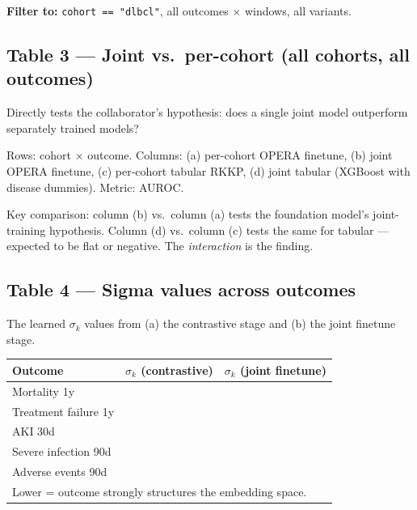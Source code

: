 \documentclass[11pt, a4paper]{article}
\newcommand{\code}[1]{\texttt{\small #1}}
\begin{document}
\medskip
\begin{tcolorbox}[notebox]
  \textbf{Filter to:} \code{cohort == "dlbcl"}, all outcomes × windows, all variants.
\end{tcolorbox}

\subsection{Table 3 — Joint vs.\ per-cohort (all cohorts, all outcomes)}

Directly tests the collaborator's hypothesis: does a single joint model
outperform separately trained models?

\medskip
Rows: cohort × outcome. Columns: (a) per-cohort OPERA finetune,
(b) joint OPERA finetune, (c) per-cohort tabular RKKP,
(d) joint tabular (XGBoost with disease dummies). Metric: AUROC.

\medskip
\begin{tcolorbox}[notebox]
  Key comparison: column (b) vs.\ column (a) tests the foundation
  model's joint-training hypothesis. Column (d) vs.\ column (c) tests
  the same for tabular — expected to be flat or negative. The
  \emph{interaction} is the finding.
\end{tcolorbox}

\subsection{Table 4 — Sigma values across outcomes}

The learned $\sigma_k$ values from (a) the contrastive stage and
(b) the joint finetune stage.

\begin{center}
\begin{tabular}{lcc}
  \toprule
  \textbf{Outcome} & $\sigma_k$ (contrastive) & $\sigma_k$ (joint finetune) \\
  \midrule
  Mortality 1y        & & \\
  Treatment failure 1y & & \\
  AKI 30d             & & \\
  Severe infection 90d & & \\
  Adverse events 90d  & & \\
  \bottomrule
  \multicolumn{3}{l}{\small Lower = outcome strongly structures the embedding space.}
\end{tabular}
\end{center}

\end{document}
